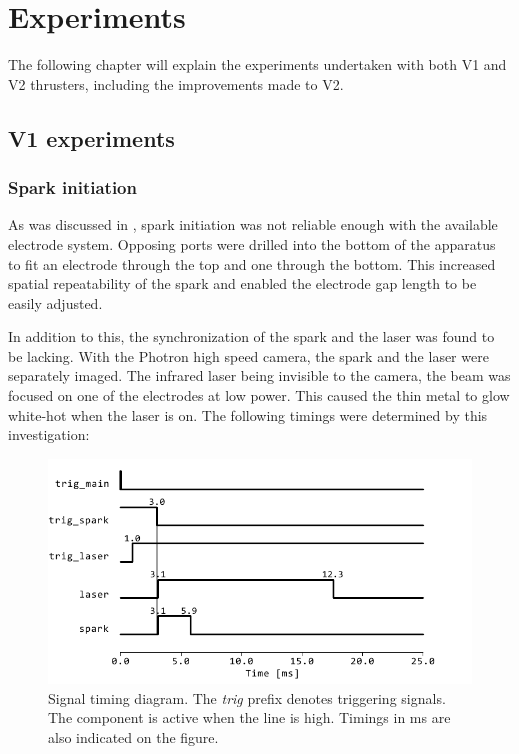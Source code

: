 \chapter{Experiments}

    The following chapter will explain the experiments undertaken with both V1 and V2 thrusters, including the improvements made to V2.

    \section{V1 experiments}

        \subsection{Spark initiation}
            
            As was discussed in \textcite{duplayArgonLaserPlasmaThruster2024a}, spark initiation was not reliable enough with the available electrode system. Opposing ports were drilled into the bottom of the apparatus to fit an electrode through the top and one through the bottom. This increased spatial repeatability of the spark and enabled the electrode gap length to be easily adjusted.

            In addition to this, the synchronization of the spark and the laser was found to be lacking. With the Photron high speed camera, the spark and the laser were separately imaged. The infrared laser being invisible to the camera, the beam was focused on one of the electrodes at low power. This caused the thin metal to glow white-hot when the laser is on. The following timings were determined by this investigation:

            \begin{figure}
                \centering
                \includegraphics[width=\textwidth]{assets/4 experiments/timings.pdf}
                \caption{Signal timing diagram. The \textit{trig} prefix denotes triggering signals. The component is active when the line is high. Timings in \unit{ms} are also indicated on the figure.}
            \end{figure}

